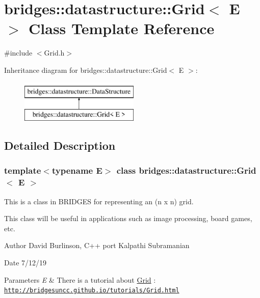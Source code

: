 \hypertarget{classbridges_1_1datastructure_1_1_grid}{}\section{bridges\+:\+:datastructure\+:\+:Grid$<$ E $>$ Class Template Reference}
\label{classbridges_1_1datastructure_1_1_grid}


{\ttfamily \#include $<$Grid.\+h$>$}

Inheritance diagram for bridges\+:\+:datastructure\+:\+:Grid$<$ E $>$\+:\begin{figure}[H]
\begin{center}
\leavevmode
\includegraphics[height=2.000000cm]{classbridges_1_1datastructure_1_1_grid}
\end{center}
\end{figure}


\subsection{Detailed Description}
\subsubsection*{template$<$typename E$>$\newline
class bridges\+::datastructure\+::\+Grid$<$ E $>$}

This is a class in B\+R\+I\+D\+G\+ES for representing an (n x n) grid. 

This class will be useful in applications such as image processing, board games, etc.

\begin{DoxyAuthor}{Author}
David Burlinson, C++ port Kalpathi Subramanian 
\end{DoxyAuthor}
\begin{DoxyDate}{Date}
7/12/19
\end{DoxyDate}

\begin{DoxyParams}{Parameters}
{\em E} & There is a tutorial about \mbox{\hyperlink{classbridges_1_1datastructure_1_1_grid}{Grid}} \+: \href{http://bridgesuncc.github.io/tutorials/Grid.html}{\tt http\+://bridgesuncc.\+github.\+io/tutorials/\+Grid.\+html} \\
\hline
\end{DoxyParams}
